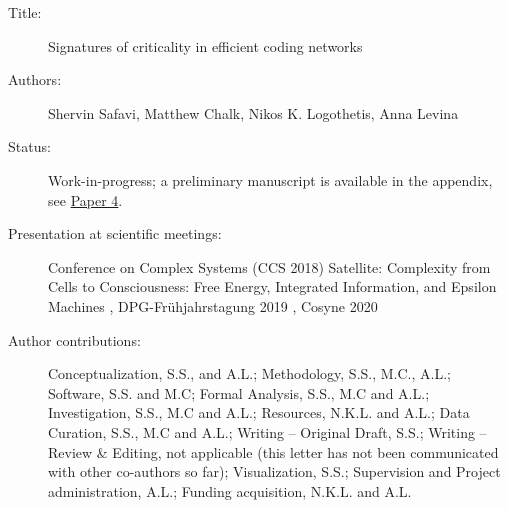 \begin{description}
\item[Title:]
  Signatures of criticality in efficient coding networks
\item[Authors:]
  Shervin Safavi,
  Matthew Chalk,
  Nikos K. Logothetis,
  Anna Levina

\item[Status:]
  Work-in-progress; a preliminary  manuscript is available in the appendix,
  see \hyperref[pdf:safavi2020sce]{Paper 4}.
\item[Presentation at scientific meetings:]
  Conference on Complex Systems (CCS 2018) Satellite: Complexity from Cells to Consciousness: Free Energy, Integrated Information, and Epsilon Machines
  \cite{safaviOptimalEfficientCoding2018},
  DPG-Fr\"uhjahrstagung 2019
  \cite{safaviSignaturesCriticalityEfficient2019a},
  Cosyne 2020
  \cite{levinaSignaturesCriticalityObserved2020a}  
\item[Author contributions: ]

  Conceptualization, S.S., and A.L.;
  Methodology, S.S., M.C., A.L.;
  Software, S.S. and M.C;
  Formal Analysis, S.S., M.C and A.L.;
  Investigation, S.S., M.C and A.L.; 
  Resources, N.K.L. and A.L.;
  Data Curation, S.S., M.C and A.L.;
  Writing -- Original Draft, S.S.;
  Writing -- Review \& Editing, not applicable
  (this letter has not been communicated with other co-authors so far);
  Visualization, S.S.;
  Supervision and Project administration, A.L.;
  Funding acquisition, N.K.L. and A.L.
\end{description}

